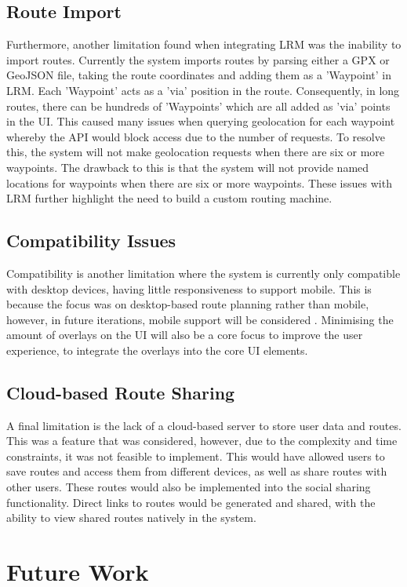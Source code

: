 \subsection{Route Import}
Furthermore, another limitation found when integrating LRM was the inability to import routes. Currently the system imports routes by parsing either a GPX or GeoJSON file, taking the route coordinates and adding them as a 'Waypoint' in LRM. Each 'Waypoint' acts as a 'via' position in the route. Consequently, in long routes, there can be hundreds of 'Waypoints' which are all added as 'via' points in the UI. This caused many issues when querying geolocation for each waypoint whereby the API would block access due to the number of requests. To resolve this, the system will not make geolocation requests when there are six or more waypoints. The drawback to this is that the system will not provide named locations for waypoints when there are six or more waypoints. These issues with LRM further highlight the need to build a custom routing machine.

\subsection{Compatibility Issues}
Compatibility is another limitation where the system is currently only compatible with desktop devices, having little responsiveness to support mobile. This is because the focus was on desktop-based route planning rather than mobile, however, in future iterations, mobile support will be considered . Minimising the amount of overlays on the UI will also be a core focus to improve the user experience, to integrate the overlays into the core UI elements.

\subsection{Cloud-based Route Sharing}
A final limitation is the lack of a cloud-based server to store user data and routes. This was a feature that was considered, however, due to the complexity and time constraints, it was not feasible to implement. This would have allowed users to save routes and access them from different devices, as well as share routes with other users. These routes would also be implemented into the social sharing functionality. Direct links to routes would be generated and shared, with the ability to view shared routes natively in the system.

\section{Future Work}
\label{evaluation:future}

